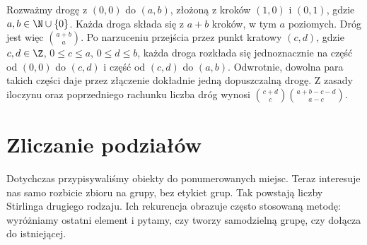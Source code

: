 \begin{przyklad}
Rozważmy drogę z $(0,0)$ do $(a,b)$, złożoną z kroków $(1,0)$ i $(0,1)$,
gdzie $a,b\in\N\cup\{0\}$. Każda droga składa się z $a+b$ kroków,
w tym $a$ poziomych. Dróg jest więc $\binom{a+b}{a}$.
Po narzuceniu przejścia przez punkt kratowy $(c,d)$, gdzie
$c,d\in\Z$, $0\leq c\leq a$, $0\leq d\leq b$, każda droga
rozkłada się jednoznacznie na część od $(0,0)$ do $(c,d)$
i część od $(c,d)$ do $(a,b)$. Odwrotnie, dowolna para takich
części daje przez złączenie dokładnie jedną dopuszczalną drogę.
Z zasady iloczynu oraz poprzedniego rachunku liczba dróg wynosi
$\binom{c+d}c\binom{a+b-c-d}{a-c}$.
\end{przyklad}

\section{Zliczanie podziałów}
Dotychczas przypisywaliśmy obiekty do ponumerowanych miejsc.
Teraz interesuje nas samo rozbicie zbioru na grupy, bez etykiet
grup. Tak powstają liczby Stirlinga drugiego rodzaju. Ich
rekurencja obrazuje często stosowaną metodę: wyróżniamy ostatni
element i pytamy, czy tworzy samodzielną grupę, czy dołącza
do istniejącej.

